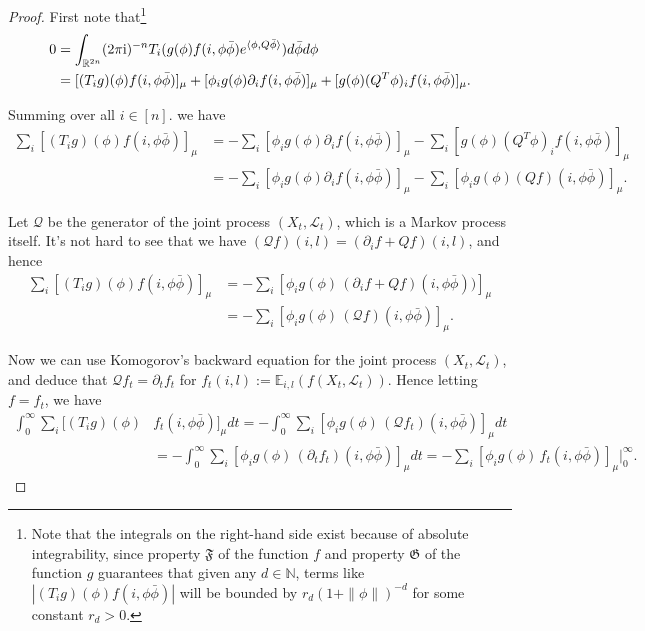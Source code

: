 \documentclass[a4paper, 11pt]{article}
\newcommand{\E}{\mathbb{E}}
\newcommand{\Ell}{\mathcal{L}}
\newcommand{\compi}{\textnormal{i}}
\newcommand{\orth}{{\mathbb{R}^{2n}}}
\begin{document}
\begin{proof}
First note that\footnote{Note that the integrals on the right-hand side exist because of absolute integrability, since property $\mathfrak{F}$ of the function $f$ and property $\mathfrak{G}$ of the function $g$ guarantees that given any $d\in\mathbb{N}$, terms like $|(T_ig)(\phi)f(i,\phi\bar{\phi})|$ will be bounded by $r_d(1+\|\phi\|)^{-d}$ for some constant $r_d>0$.}
\begin{equation*}
\begin{aligned}
0
&=\int_\orth (2 \pi \compi)^{-n} T_i(g(\phi)f(i,\phi\bar{\phi})e^{\langle \phi,Q\bar{\phi}\rangle})d \bar{\phi} d \phi\\
&= [ (T_ig)(\phi)f(i,\phi\bar{\phi})]_\mu
+[ \phi_i g(\phi)\partial_if(i,\phi\bar{\phi})]_\mu
+[ g(\phi)(Q^T\phi)_if(i,\phi\bar{\phi})]_\mu.
\end{aligned}
\end{equation*}

Summing over all $i\in[n]$. we have
\begin{equation*}
\begin{aligned}
\sum_i[ (T_ig)(\phi)f(i,\phi\bar{\phi})]_\mu
&=
-\sum_i[ \phi_i g(\phi)\partial_if(i,\phi\bar{\phi})]_\mu
-\sum_i[ g(\phi)(Q^T\phi)_if(i,\phi\bar{\phi})]_\mu\\
&= -\sum_i[ \phi_i g(\phi)\partial_if(i,\phi\bar{\phi})]_\mu
-\sum_i[ \phi_ig(\phi)(Qf)(i,\phi\bar{\phi})]_\mu.
\end{aligned}
\end{equation*}

Let $\mathcal{Q}$ be the generator of the joint process $(X_t, \Ell_t)$, which is a Markov process itself. It's not hard to see that we have $(\mathcal{Q} f)(i,l)=(\partial_if+Qf)(i,l)$, and hence
\begin{equation*}
\begin{aligned}
\sum_i[(T_ig)(\phi)f(i,\phi\bar{\phi})]_\mu
&= -\sum_i[\phi_i g(\phi)\,(\partial_if
+Qf)(i,\phi\bar{\phi}))]_\mu\\
&= -\sum_i[\phi_i g(\phi)\,(\mathcal{Q} f)(i,\phi\bar{\phi})]_\mu.
\end{aligned}
\end{equation*}

Now we can use Komogorov's backward equation for the joint process $(X_t,\Ell_t)$, and deduce that $\mathcal{Q} f_t=\partial_t f_t$ for $f_t(i,l):=\E_{i,l}(f(X_t, \Ell_t))$. Hence letting $f=f_t$, we have
\begin{equation*}
\begin{aligned}
\int_0^\infty\sum_i [(T_ig)(\phi) & f_t(i,\phi\bar{\phi})]_\mu dt
= - \int_0^\infty \sum_i[\phi_i g(\phi)\,(\mathcal{Q} f_t)(i,\phi\bar{\phi})]_\mu dt\\
&= - \int_0^\infty \sum_i[\phi_i g(\phi)\,(\partial_t f_t)(i,\phi\bar{\phi})]_\mu dt= - \sum_i[\phi_i g(\phi)\,f_t(i,\phi\bar{\phi})]_\mu \Big|_0^\infty.
\end{aligned}
\end{equation*}


\end{proof}
\end{document}
